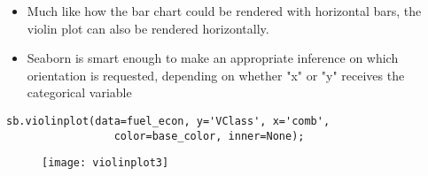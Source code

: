 \documentclass[12pt]{beamer}
\begin{document}
    \begin{frame}[fragile]{}
    	\begin{itemize}
    		\item Much like how the bar chart could be rendered with horizontal bars, the violin plot can also be rendered horizontally. 
    		\item Seaborn is smart enough to make an appropriate inference on which orientation is requested, depending on whether "x" or "y" receives the categorical variable
    	\end{itemize}
    		\fontsize{10}{1}
    		\begin{verbatim}
sb.violinplot(data=fuel_econ, y='VClass', x='comb',
                 color=base_color, inner=None);
    		\end{verbatim}
    \begin{figure}
    	\centering
    	\texttt{[image: violinplot3]}
    \end{figure}
    \end{frame}
\end{document}

